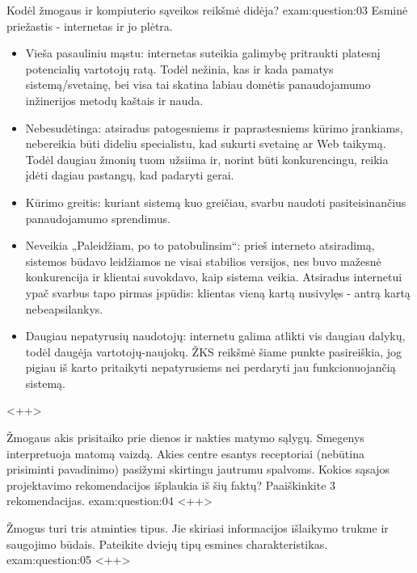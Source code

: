 \begin{question}{%
  Kodėl žmogaus ir kompiuterio sąveikos reikšmė didėja?
  }{exam:question:03}
  Esminė priežastis - internetas ir jo plėtra. 
  \begin{itemize}
    \item{Vieša pasauliniu mąstu: internetas suteikia galimybę 
      pritraukti platesnį potencialių vartotojų ratą.
      Todėl nežinia, kas ir kada pamatys sistemą/svetainę, bei visa tai skatina labiau
      domėtis panaudojamumo inžinerijos metodų kaštais ir nauda.}
    \item{Nebesudėtinga: atsiradus patogesniems ir paprastesniems kūrimo įrankiams, 
      nebereikia būti dideliu specialistu, kad sukurti svetainę ar Web taikymą.
      Todėl daugiau žmonių tuom užsiima ir, norint būti konkurencingu, reikia įdėti 
      dagiau pastangų, kad padaryti gerai.
      }
    \item{Kūrimo greitis: kuriant sistemą kuo greičiau, svarbu naudoti pasiteisinančius
      panaudojamumo sprendimus.
      }
    \item{Neveikia „Paleidžiam, po to patobulinsim“: prieš interneto atsiradimą, sistemos 
      būdavo leidžiamos ne visai stabilios versijos, nes buvo mažesnė konkurencija ir 
      klientai suvokdavo, kaip sistema veikia. Atsiradus internetui ypač svarbus tapo 
      pirmas įspūdis: klientas vieną kartą nusivylęs - antrą kartą nebeapsilankys.
      }
    \item{Daugiau nepatyrusių naudotojų: internetu galima atlikti vis daugiau dalykų,
      todėl daugėja vartotojų-naujokų. ŽKS reikšmė šiame punkte pasireiškia, jog pigiau
      iš karto pritaikyti nepatyrusiems nei perdaryti jau funkcionuojančią sistemą.
      }
  \end{itemize}
  <++>
\end{question}

\begin{question}{%
  Žmogaus akis prisitaiko prie dienos ir nakties matymo sąlygų. Smegenys
  interpretuoja matomą vaizdą. Akies centre esantys receptoriai
  (nebūtina prisiminti pavadinimo) pasižymi skirtingu jautrumu spalvoms.
  Kokios sąsajos projektavimo rekomendacijos išplaukia iš šių faktų?
  Paaiškinkite 3 rekomendacijas.
  }{exam:question:04}
  <++>
\end{question}

\begin{question}{%
  Žmogus turi tris atminties tipus. Jie skiriasi informacijos išlaikymo
  trukme ir saugojimo būdais. Pateikite dviejų tipų esmines
  charakteristikas.
  }{exam:question:05}
  <++>
\end{question}


